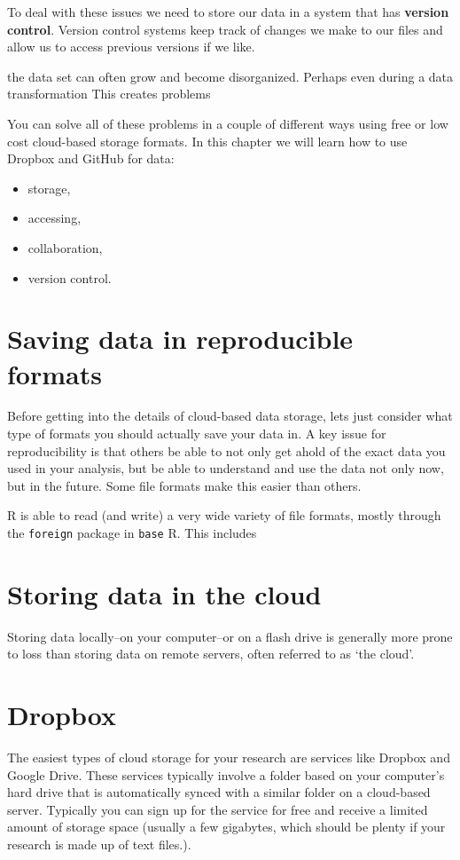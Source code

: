 \documentclass[ChapterTOCs,krantz1]{krantz}\usepackage{graphicx, color}
\begin{document}
To deal with these issues we need to store our data in a system that has
\textbf{version control}. Version control systems keep track of changes
we make to our files and allow us to access previous versions if we
like.

the data set can often grow and become disorganized. Perhaps even during
a data transformation This creates problems

You can solve all of these problems in a couple of different ways using
free or low cost cloud-based storage formats. In this chapter we will
learn how to use Dropbox and GitHub for data:

\begin{itemize}
    \item storage,
    \item accessing,
    \item collaboration,
    \item version control.
\end{itemize}

\section{Saving data in reproducible formats}

Before getting into the details of cloud-based data storage, lets just
consider what type of formats you should actually save your data in. A
key issue for reproducibility is that others be able to not only get
ahold of the exact data you used in your analysis, but be able to
understand and use the data not only now, but in the future. Some file
formats make this easier than others.

R is able to read (and write) a very wide variety of file
formats, mostly through the \texttt{foreign} package in \texttt{base}
R. This includes

\section{Storing data in the cloud}

Storing data locally--on your computer--or on a flash drive is generally
more prone to loss than storing data on remote servers, often referred
to as `the cloud'.

\section{Dropbox}

The easiest types of cloud storage for your research are services like
Dropbox and Google Drive. These services typically
involve a folder based on your computer's hard drive that is
automatically synced with a similar folder on a cloud-based server.
Typically you can sign up for the service for free and receive a limited
amount of storage space (usually a few gigabytes, which should be plenty
if your research is made up of text files.).
\end{document}
